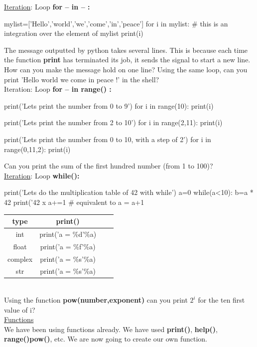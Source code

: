 \documentclass[article,10pt]{scrartcl}
\begin{document}
\underline{Iteration}: Loop \textbf{for -- in -- :}
\begin{python}
mylist=['Hello','world','we','come','in','peace']
for i in mylist: # this is an integration over the element of mylist
   print(i)
\end{python}

The message outputted by python takes several lines. This is because each time the function \textbf{print} has terminated its job, it sends the signal to start a new line. How can you make the message hold on one line? Using the same loop, can you print 'Hello world we come in peace !' in the shell?\\

Iteration: Loop \textbf{for -- in range() :}
\begin{python}
print('Lets print the number from 0 to 9')
for i in range(10):
   print(i)

print('Lets print the number from 2 to 10')
for i in range(2,11):
   print(i)

print('Lets print the number from 0 to 10, with a step of 2')
for i in range(0,11,2):
   print(i)
\end{python}
Can you print the sum of the first hundred number (from 1 to 100)? %
\\

\underline{Iteration}: Loop \textbf{while():}
\begin{python}
print('Lets do the multiplication table of 42 with while')
a=0
while(a<10):
   b=a * 42
   print('42 x %
   a+=1 # equivalent to a = a+1
\end{python}

\begin{tabular}{|c|c|c|c|}
\hline
type & print()\\
\hline
 int &  print('a = \%d'\%a)\\
\hline
 float & print('a = \%f'\%a)\\
\hline
 complex & print('a = \%s'\%a)\\
\hline
 str & print('a = \%s'\%a)\\
\hline
\end{tabular}\\

Using the function \textbf{pow(number,exponent)} can you print $2^i$ for the ten first value of i?\\

\underline{Functions}\\
We have been using functions already. We have used \textbf{print()}, \textbf{help()}, \textbf{range()}\textbf{pow()}, etc. We are now going to create our own function.
\end{document}
